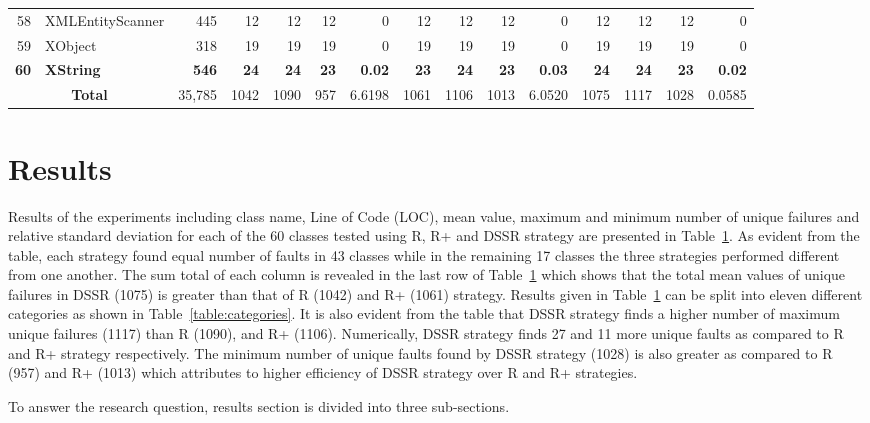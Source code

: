 \documentclass{acm_proc_article-sp}
\begin{document}
\begin{table} [htp!]
{\begin{tabularx}{1 \textwidth}{r l r r r r r r r r r r r r r}
58						& XMLEntityScanner			&445		& 12		&	12	&	12	& 	0					& 12		&  12		& 12		& 		0			& 12			& 12			& 12			&	0\\      
59						& XObject					&318		& 19		&	19	&	19	& 	0					& 19		&  19		& 19		& 		0			& 19			& 19			& 19			&	0\\      
\textbf{60}						& \textbf{XString}					&\textbf{546}		& \textbf{24}		&	\textbf{24}	&	\textbf{23}	& 	\textbf{0.02}					& \textbf{23}		&  \textbf{24}		& \textbf{23}		& 		\textbf{0.03}			& \textbf{24}			& \textbf{24}			& \textbf{23}			&	\textbf{0.02}\\      

    						\multicolumn{2}{c}{\textbf{Total}}	&35,785	&1042	&	1090	&    957	&	6.6198				& 1061	&1106	&1013	&		6.0520		& 1075		& 1117		& 1028		& 	0.0585\\
     \end{tabularx} }
    \bigskip
    \label{table:Results}
\end{table}

\section{Results}\label{sec:res}
Results of the experiments including class name, Line of Code (LOC), mean value, maximum and minimum number of unique failures and relative standard deviation for each of the 60 classes tested using R, R+ and DSSR strategy are presented in Table~\ref{table:Results}. As evident from the table, each strategy found equal number of faults in 43 classes while in the remaining 17 classes the three strategies performed different from one another. The sum total of each column is revealed in the last row of Table~\ref{table:Results} which shows that the total mean values of unique failures in DSSR (1075) is greater than that of R (1042) and R+ (1061) strategy. Results given in Table~\ref{table:Results} can be split into eleven different categories as shown in Table~\ref{table:categories}. It is also evident from the table that DSSR strategy finds a higher number of maximum unique failures (1117) than R (1090), and R+ (1106). Numerically, DSSR strategy finds 27 and 11 more unique faults as compared to R and R+ strategy respectively. The minimum number of unique faults found by DSSR strategy (1028) is also greater as compared to R (957) and R+ (1013) which attributes to higher efficiency of DSSR strategy over R and R+ strategies.

To answer the research question, results section is divided into three sub-sections.
\end{document}
